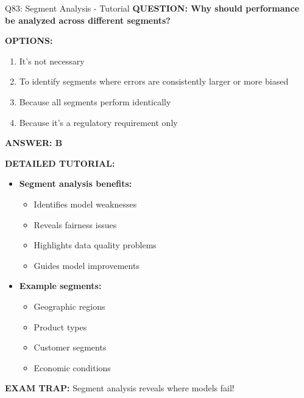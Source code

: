 \documentclass[8pt]{beamer}
\begin{document}
\begin{frame}{Q83: Segment Analysis - Tutorial}
	\fontsize{6.5}{7.5}\selectfont
	\textbf{QUESTION: Why should performance be analyzed across different segments?}
	
	\vspace{0.1cm}
	\textbf{OPTIONS:}
	\begin{enumerate}
		\item It's not necessary
		\item To identify segments where errors are consistently larger or more biased
		\item Because all segments perform identically
		\item Because it's a regulatory requirement only
	\end{enumerate}
	
	\vspace{0.1cm}
	\textcolor{myblue}{\textbf{ANSWER: B}}
	
	\vspace{0.1cm}
	\textbf{DETAILED TUTORIAL:}
	\begin{itemize}
		\item \textbf{Segment analysis benefits:}
		\begin{itemize}
			\item Identifies model weaknesses
			\item Reveals fairness issues
			\item Highlights data quality problems
			\item Guides model improvements
		\end{itemize}
		\item \textbf{Example segments:}
		\begin{itemize}
			\item Geographic regions
			\item Product types
			\item Customer segments
			\item Economic conditions
		\end{itemize}
	\end{itemize}
	
	\textcolor{myred}{\textbf{EXAM TRAP:}} Segment analysis reveals \textcolor{myblue}{where models fail}!
\end{frame}
\end{document}

